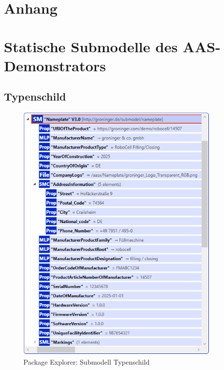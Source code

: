 \section*{Anhang}
{}


\section{Statische Submodelle des AAS-Demonstrators}
\subsection{Typenschild}
\begin{figure}[H]
    \centering
    \includegraphics[width=0.9\textwidth]{Bilder/ErgebnissePackageExplorer/Typenschild.PNG}
    \caption{Package Explorer: Submodell Typenschild}
\end{figure}


